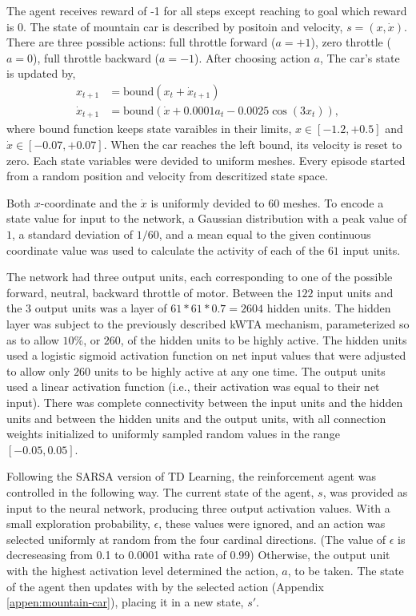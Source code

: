 \documentclass[preprint,12pt,authoryear]{elsarticle}
\begin{document}
The agent receives reward of -1 for all steps except reaching to goal which reward is 0. The state of mountain car is described by positoin and velocity, $s=(x,\dot{x})$. There are three possible actions: full throttle forward ($a=+1$), zero throttle ($a=0$), full throttle backward ($a=-1$). After choosing action $a$, The car's state is updated by,
\begin{align*}
	x_{t+1} &= \text{bound} (x_t + \dot{x}_{t+1}) \\
	\dot{x}_{t+1} &= \text{bound} (\dot{x}+ 0.0001 a_t - 0.0025 \cos(3 x_t)),
\end{align*}
where bound function keeps state varaibles in their limits, $x \in [-1.2,+0.5]$ and $\dot{x} \in [-0.07,+0.07]$. When the car reaches the left bound, its velocity is reset to zero. Each state variables were devided to uniform meshes. Every episode started from a random position and velocity from descritized state space.  





Both $x$-coordinate and the $\dot{x}$ is uniformly devided to 60 meshes. To encode a state value for input to the
network, a Gaussian distribution with a peak value of $1$, a standard
deviation of $1/60$, and a mean equal to the given continuous
coordinate value was used to calculate the activity of each of
the $61$ input units.

The network had three output units, each corresponding to one of the possible forward, neutral, backward throttle of motor. Between the $122$ input units and the $3$ output units was a layer of $61*61*0.7 = 2604$ hidden units. The hidden layer was
subject to the previously described kWTA mechanism, parameterized so
as to allow $10\%$, or $260$, of the hidden units to be highly active.
The hidden units used a logistic sigmoid activation function on net
input values that were adjusted to allow only $260$ units to be highly
active at any one time. The output units used a linear activation
function (i.e., their activation was equal to their net input). There
was complete connectivity between the input units and the hidden units
and between the hidden units and the output units, with all connection
weights initialized to uniformly sampled random values in the range
$[-0.05,0.05]$.




Following the SARSA version of TD Learning, the reinforcement agent
was controlled in the following way. The current state of the
agent, $s$, was provided as input to the neural network, producing
three output activation values. With a small exploration probability,
$\epsilon$, these values were ignored, and an action was selected
uniformly at random from the four cardinal directions. (The value of
$\epsilon$ is decreseasing from 0.1 to 0.0001 witha rate of 0.99) Otherwise, the output unit
with the highest activation level determined the action, $a$, to be
taken. The state of the agent then updates with by the selected action (Appendix \ref{appen:mountain-car}), placing it in a new state, $s'$.
\end{document}
